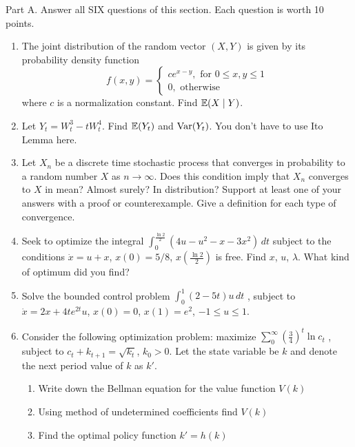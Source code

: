 \documentclass[12pt, a4paper]{article}
\begin{document}
Part A.
Answer all SIX questions of this section. Each question is worth 10 points.

\begin{enumerate}
\item  The joint distribution of the random vector $(X,Y)$ is given by its probability density function
\[
f(x,y)=
\left\{
  \begin{array}{l}
    c e^{x-y}, \text{ for } 0\leq x,y\leq 1 \\
    0, \text{ otherwise}
  \end{array}
\right.
\]
where $c$ is a normalization constant. 
Find $\operatorname{\mathbb{E}}(X\mid Y)$.

\item Let $Y_t=W_t^3-tW_t^4$. Find $\operatorname{\mathbb{E}}(Y_t)$ and $\operatorname{Var}(Y_t)$.  You don't have to use Ito Lemma here.
\item Let $X_n$ be a discrete time stochastic process that converges in probability to a random number $X$ as $n\to \infty$. Does this condition imply that $X_n$ converges to $X$ in mean? Almost surely? In distribution? Support at least one of your answers with a proof or counterexample. Give a definition for each type of convergence.
\item Seek to optimize the integral
$\int_0^{\frac{\ln 2}{2}} (4u-u^2-x-3x^2)\,dt$
subject to the conditions $\dot{x}=u+x$, $x(0)=5/8$, $x\left(\frac{\ln 2}{2}\right)$ is free. Find $x$, $u$, $\lambda$. What kind of optimum did you find?
\item Solve the bounded control problem
$\int_0^1 (2-5t)u\,dt$
, subject to $\dot{x}=2x+4te^{2t}u$, $x(0)=0$, $x(1)=e^2$, $-1\leq u\leq 1$.
\item Consider the following optimization problem: maximize
$\sum_0^{\infty} \left(\frac{3}{4}\right)^t \ln c_t$
, subject to $c_t+k_{t+1}=\sqrt{k_t}$, $k_0>0$. Let the state variable be $k$ and denote the next period value of $k$ as $k'$.
\begin{enumerate}
\item Write down the Bellman equation for the value function $V(k)$
\item Using method of undetermined coefficients find $V(k)$
\item Find the optimal policy function $k'=h(k)$
\end{enumerate}

\end{enumerate}
\end{document}
